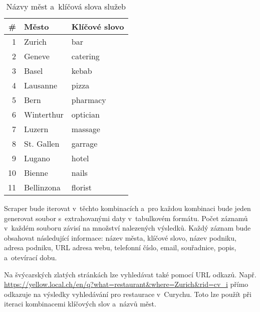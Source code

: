 \documentclass[11pt,a4paper]{article}
\begin{document}
\begin{table}[ht]
\centering
\begin{tabular}{rll}
\textbf{\#} & \textbf{Město} & \textbf{Klíčové slovo}                                        \\
\hline
1  & Zurich                             & bar                                        \\
2  & Geneve                             & catering                                   \\
3  & Basel                              & kebab                                      \\
4  & Lausanne                           & pizza                                      \\
5  & Bern                               & pharmacy                                   \\
6  & Winterthur                         & optician                                   \\
7  & Luzern                             & massage                                    \\
8  & St. Gallen                         & garrage                                    \\
9  & Lugano                             & hotel                                      \\
10 & Bienne                             & nails                                      \\
11 & Bellinzona                         & florist           
\end{tabular}
\caption{Názvy měst a~klíčová slova služeb}
\end{table}

Scraper bude iterovat v~těchto kombinacích a~pro každou kombinaci bude jeden generovat soubor s~extrahovanými daty v~tabulkovém formátu. Počet záznamů v~každém souboru závisí na množství nalezených výsledků. Každý záznam bude obsahovat následující informace: název města, klíčové slovo, název podniku, adresa podniku, URL adresa webu, telefonní číslo, email, souřadnice, popis, a~otevírací dobu.

Na švýcarských zlatých stránkách lze vyhledávat také pomocí URL odkazů. Např. \url{https://yellow.local.ch/en/q?what=restaurant&where=Zurich&rid=cv_i} přímo odkazuje na výsledky vyhledávání pro restaurace v~Curychu. Toto lze použít při iteraci kombinacemi klíčových slov a~názvů měst.


\end{document}
